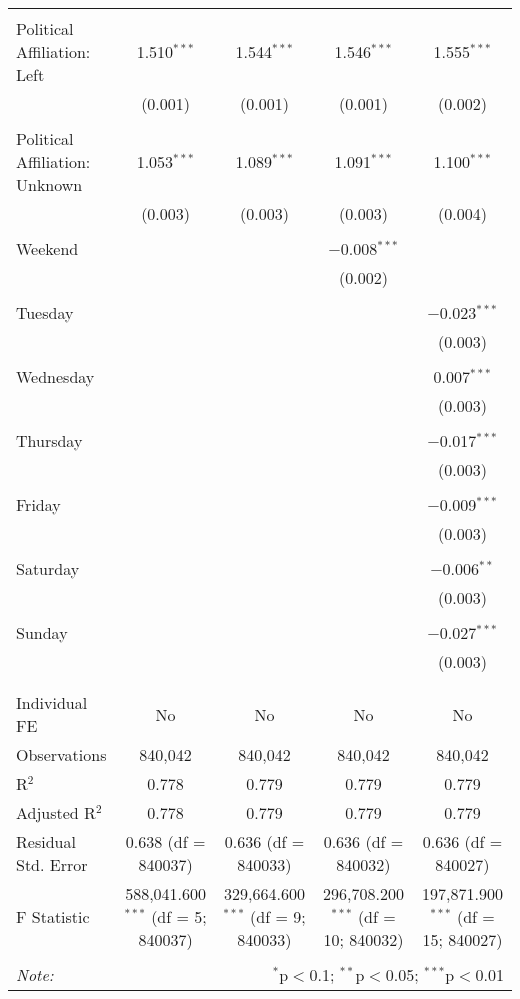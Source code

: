 \documentclass[
]{article}
\begin{document}
\begin{table}[!htbp]
{\begin{tabular}{@{\extracolsep{5pt}}lcccc}
  & & & & \\ 
 Political Affiliation: Left & 1.510$^{***}$ & 1.544$^{***}$ & 1.546$^{***}$ & 1.555$^{***}$ \\ 
  & (0.001) & (0.001) & (0.001) & (0.002) \\ 
  & & & & \\ 
 Political Affiliation: Unknown & 1.053$^{***}$ & 1.089$^{***}$ & 1.091$^{***}$ & 1.100$^{***}$ \\ 
  & (0.003) & (0.003) & (0.003) & (0.004) \\ 
  & & & & \\ 
 Weekend &  &  & $-$0.008$^{***}$ &  \\ 
  &  &  & (0.002) &  \\ 
  & & & & \\ 
 Tuesday &  &  &  & $-$0.023$^{***}$ \\ 
  &  &  &  & (0.003) \\ 
  & & & & \\ 
 Wednesday &  &  &  & 0.007$^{***}$ \\ 
  &  &  &  & (0.003) \\ 
  & & & & \\ 
 Thursday &  &  &  & $-$0.017$^{***}$ \\ 
  &  &  &  & (0.003) \\ 
  & & & & \\ 
 Friday &  &  &  & $-$0.009$^{***}$ \\ 
  &  &  &  & (0.003) \\ 
  & & & & \\ 
 Saturday &  &  &  & $-$0.006$^{**}$ \\ 
  &  &  &  & (0.003) \\ 
  & & & & \\ 
 Sunday &  &  &  & $-$0.027$^{***}$ \\ 
  &  &  &  & (0.003) \\ 
  & & & & \\ 
\hline \\[-1.8ex] 
Individual FE & No & No & No & No \\ 
Observations & 840,042 & 840,042 & 840,042 & 840,042 \\ 
R$^{2}$ & 0.778 & 0.779 & 0.779 & 0.779 \\ 
Adjusted R$^{2}$ & 0.778 & 0.779 & 0.779 & 0.779 \\ 
Residual Std. Error & 0.638 (df = 840037) & 0.636 (df = 840033) & 0.636 (df = 840032) & 0.636 (df = 840027) \\ 
F Statistic & 588,041.600$^{***}$ (df = 5; 840037) & 329,664.600$^{***}$ (df = 9; 840033) & 296,708.200$^{***}$ (df = 10; 840032) & 197,871.900$^{***}$ (df = 15; 840027) \\ 
\hline 
\hline \\[-1.8ex] 
\textit{Note:}  & \multicolumn{4}{r}{$^{*}$p$<$0.1; $^{**}$p$<$0.05; $^{***}$p$<$0.01} \\ 
\end{tabular}
} 
\end{table} 
\newpage
\end{document}

